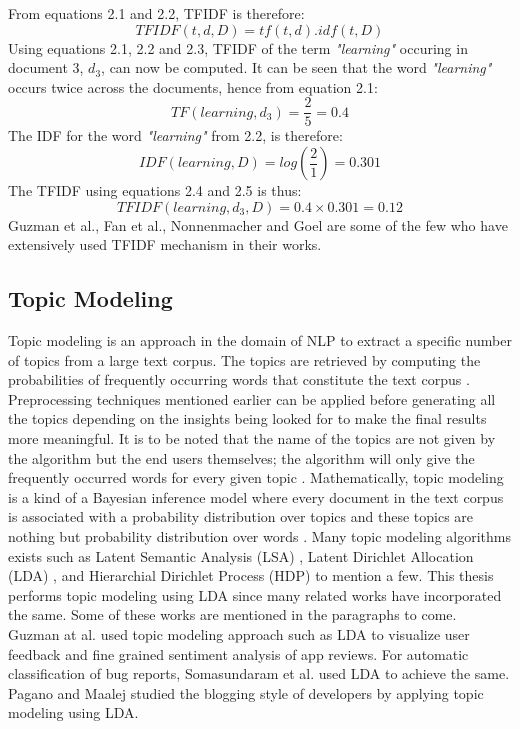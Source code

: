 \documentclass[a4paper,12pt,twoside]{report}
\begin{document}
From equations 2.1 and 2.2, TFIDF is therefore:
\begin{equation}
\label{eq:et}
    TFIDF(t, d, D) = tf(t, d).idf(t, D)
\end{equation}
Using equations 2.1, 2.2 and 2.3, TFIDF of the term  \textit{"learning"} occuring in document 3, $d_3$, can now be computed. It can be seen that the word \textit{"learning"} occurs twice across the documents, hence from equation 2.1:
\begin{equation}
\label{eq:et}
    TF(learning, d_3) = \frac{2}{5} = 0.4
\end{equation}
The IDF for the word \textit{"learning"} from 2.2, is therefore:
\begin{equation}
\label{eq:et}
    IDF(learning, D) = log(\frac{2}{1}) = 0.301
\end{equation}
The TFIDF using equations 2.4 and 2.5 is thus:
\begin{equation}
\label{eq:et}
    TFIDF(learning, d_3, D) = 0.4\times0.301 = 0.12
\end{equation}
\bigbreak
Guzman et al.\cite{Guzman2017}, Fan et al.\cite{Fan2017}, Nonnenmacher\cite{Nonnenmacher2017} and Goel \cite{Goel2017} are some of the few who have extensively used TFIDF mechanism in their works.  
\subsection{Topic Modeling}
Topic modeling is an approach in the domain of NLP to extract a specific number of topics from a large text corpus. The topics are retrieved by computing the probabilities of frequently occurring words that constitute the text corpus \cite{Zou2017} \cite{Linstead2007}. Preprocessing techniques mentioned earlier can be applied before generating all the topics depending on the insights being looked for to make the final results more meaningful. It is to be noted that the name of the topics are not given by the algorithm but the end users themselves; the algorithm will only give the frequently occurred words for every given topic \cite{Goel2017}.
\bigbreak
Mathematically, topic modeling is a kind of a Bayesian inference model where every document in the text corpus is associated with a probability distribution over topics and these topics are nothing but probability distribution over words \cite{Goel2017}. Many topic modeling algorithms exists such as Latent Semantic Analysis (LSA) \cite{Agung2017}\cite{Tu2017}, Latent Dirichlet Allocation (LDA) \cite{Katsumata2016} \cite{Chen2016}, and Hierarchial Dirichlet Process (HDP) \cite{Li2018} \cite{Hu2017} to mention a few. This thesis performs topic modeling using LDA since many related works have incorporated the same. Some of these works are mentioned in the paragraphs to come. 
\bigbreak
Guzman at al. \cite{Guzman2015} \cite{Guzman2014} used topic modeling approach such as LDA to visualize user feedback and fine grained sentiment analysis of app reviews. For automatic classification of bug reports, Somasundaram et al. \cite{Somasundaram2012} used LDA to achieve the same. Pagano and Maalej\cite{Pagano2011} studied the blogging style of developers by applying topic modeling using LDA. 
\end{document}
